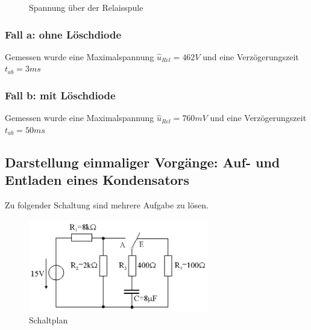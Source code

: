 \documentclass[11pt,a4paper,titlepage]{article}
\begin{document}
\begin{figure}[h!]
  \caption{Spannung \"uber der Relaisspule}
\end{figure}

\subsubsection*{Fall a: ohne L\"oschdiode}
Gemessen wurde eine Maximalspannung $\hat{u}_{Rel}=462V$ und eine Verz\"ogerungszeit $t_{ab}=3ms$
\subsubsection*{Fall b: mit L\"oschdiode}
Gemessen wurde eine Maximalspannung $\hat{u}_{Rel}=760mV$ und eine Verz\"ogerungszeit $t_{ab}=50ms$

\newpage

\subsection{Darstellung einmaliger Vorg\"ange: Auf- und Entladen eines Kondensators}
Zu folgender Schaltung sind mehrere Aufgabe zu l\"osen.
\begin{figure}[h!]
  \begin{center}
    \includegraphics[width=0.7\textwidth]{schaltplan_2_2}
    \caption{Schaltplan}
  \end{center}
\end{figure}
\end{document}
